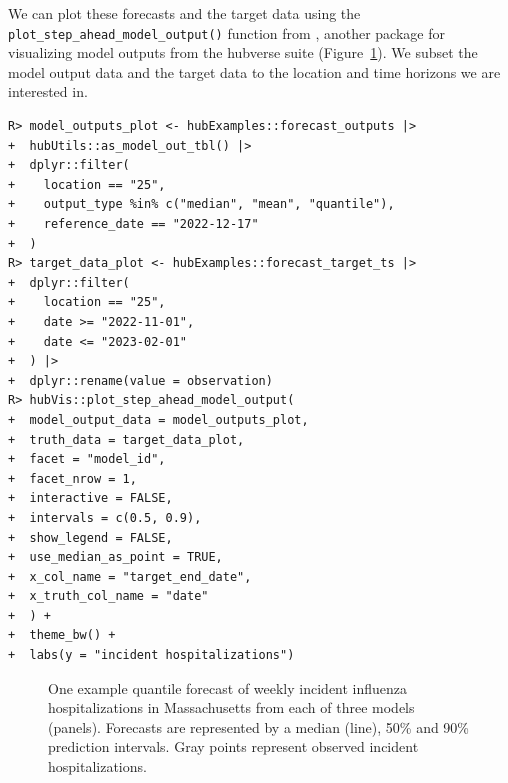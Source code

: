 \documentclass[
  article,
  shortnames,
  notitle]{jss}
\begin{document}
We can plot these forecasts and the target data using the
\texttt{plot\_step\_ahead\_model\_output()} function from ,
another package for visualizing model outputs from the hubverse suite
(Figure~\ref{fig-plot-ex-mods}). We subset the model output data and the
target data to the location and time horizons we are interested in.

\begin{verbatim}
R> model_outputs_plot <- hubExamples::forecast_outputs |>
+  hubUtils::as_model_out_tbl() |>
+  dplyr::filter(
+    location == "25",
+    output_type %in% c("median", "mean", "quantile"),
+    reference_date == "2022-12-17"
+  )
R> target_data_plot <- hubExamples::forecast_target_ts |>
+  dplyr::filter(
+    location == "25",
+    date >= "2022-11-01",
+    date <= "2023-02-01"
+  ) |>
+  dplyr::rename(value = observation)
R> hubVis::plot_step_ahead_model_output(
+  model_output_data = model_outputs_plot,
+  truth_data = target_data_plot,
+  facet = "model_id",
+  facet_nrow = 1,
+  interactive = FALSE,
+  intervals = c(0.5, 0.9),
+  show_legend = FALSE,
+  use_median_as_point = TRUE,
+  x_col_name = "target_end_date", 
+  x_truth_col_name = "date"
+  ) +
+  theme_bw() +
+  labs(y = "incident hospitalizations")
\end{verbatim}

\begin{figure}[H]


\caption{\label{fig-plot-ex-mods}One example quantile forecast of weekly
incident influenza hospitalizations in Massachusetts from each of three
models (panels). Forecasts are represented by a median (line), 50\% and
90\% prediction intervals. Gray points represent observed incident
hospitalizations.}

\end{figure}%
\end{document}

